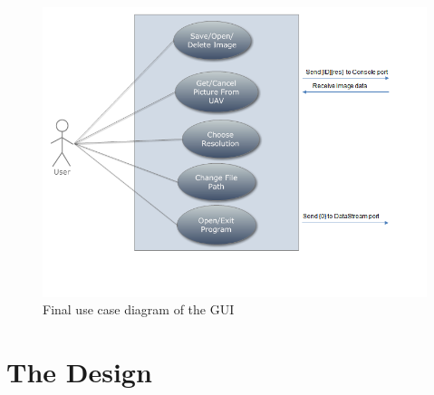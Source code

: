 \begin{figure}[!hbtp]
\begin{center}
\includegraphics[scale=0.7]{figures/FinaluserCase.png} 
\end{center}
\caption{Final use case diagram of the GUI\label{GUI_finalUseCase}}
\end{figure}



\section{The Design}

